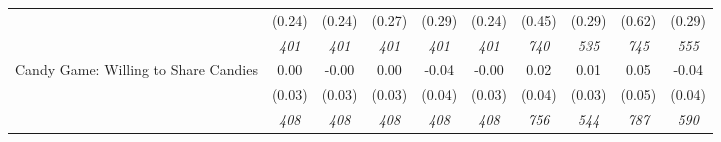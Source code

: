 \begin{tabular}{l c c c c c c c c c}
& (0.24) & (0.24) & (0.27) & (0.29) & (0.24) & (0.45) & (0.29) & (0.62) & (0.29) \\
& \textit{ 401 } & \textit{ 401 } & \textit{ 401 } & \textit{ 401 } & \textit{ 401 } & \textit{ 740 } & \textit{ 535 } & \textit{ 745 } & \textit{ 555 } \\
Candy Game: Willing to Share Candies & 0.00 & -0.00 & 0.00 & -0.04 & -0.00 & 0.02 & 0.01 & 0.05 & -0.04 \\
& (0.03) & (0.03) & (0.03) & (0.04) & (0.03) & (0.04) & (0.03) & (0.05) & (0.04) \\
& \textit{ 408 } & \textit{ 408 } & \textit{ 408 } & \textit{ 408 } & \textit{ 408 } & \textit{ 756 } & \textit{ 544 } & \textit{ 787 } & \textit{ 590 } \\
\bottomrule
\end{tabular}
